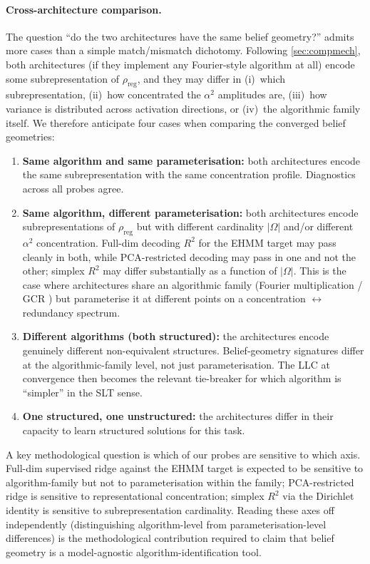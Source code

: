 \documentclass[11pt,a4paper]{article}
\begin{document}
\paragraph{Cross-architecture comparison.} The question ``do the two architectures have the same belief geometry?'' admits more cases than a simple match/mismatch dichotomy. Following \cref{sec:compmech}, both architectures (if they implement any Fourier-style algorithm at all) encode some subrepresentation of $\rho_{\mathrm{reg}}$, and they may differ in (i)~which subrepresentation, (ii)~how concentrated the $\alpha^2$ amplitudes are, (iii)~how variance is distributed across activation directions, or (iv)~the algorithmic family itself. We therefore anticipate four cases when comparing the converged belief geometries:
\begin{enumerate}[label=(\alph*)]
    \item \textbf{Same algorithm and same parameterisation:} both architectures encode the same subrepresentation with the same concentration profile. Diagnostics across all probes agree.
    \item \textbf{Same algorithm, different parameterisation:} both architectures encode subrepresentations of $\rho_{\mathrm{reg}}$ but with different cardinality $|\Omega|$ and/or different $\alpha^2$ concentration. Full-dim decoding $R^2$ for the EHMM target may pass cleanly in both, while PCA-restricted decoding may pass in one and not the other; simplex $R^2$ may differ substantially as a function of $|\Omega|$. This is the case where architectures share an algorithmic family (Fourier multiplication / GCR \citep{chughtai2023toy}) but parameterise it at different points on a concentration $\leftrightarrow$ redundancy spectrum.
    \item \textbf{Different algorithms (both structured):} the architectures encode genuinely different non-equivalent structures. Belief-geometry signatures differ at the algorithmic-family level, not just parameterisation. The LLC at convergence then becomes the relevant tie-breaker for which algorithm is ``simpler'' in the SLT sense.
    \item \textbf{One structured, one unstructured:} the architectures differ in their capacity to learn structured solutions for this task.
\end{enumerate}

A key methodological question is which of our probes are sensitive to which axis. Full-dim supervised ridge against the EHMM target is expected to be sensitive to algorithm-family but not to parameterisation within the family; PCA-restricted ridge is sensitive to representational concentration; simplex $R^2$ via the Dirichlet identity is sensitive to subrepresentation cardinality. Reading these axes off independently (distinguishing algorithm-level from parameterisation-level differences) is the methodological contribution required to claim that belief geometry is a model-agnostic algorithm-identification tool.
\end{document}
